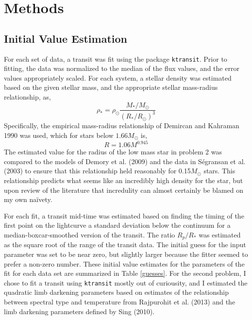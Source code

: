 \documentclass[10pt, preprint]{aastex}
\newcommand{\sol}{\ensuremath{\odot}}
\begin{document}
\section*{Methods}
\subsection{Initial Value Estimation}
For each set of data, a transit was fit using the package \verb|ktransit|. Prior to fitting, the data was normalized to the median of the flux values, and the error values appropriately scaled. For each system, a stellar density was estimated based on the given stellar mass, and the appropriate stellar mass-radius relationship, as, 
\begin{equation}
  \rho_* = \rho_\sol\frac{M_*/M_\sol}{(R_*/R_\sol)^3}
\end{equation}
Specifically, the empirical mass-radius relationship of Demircan and Kahraman 1990 was used, which for stars below $1.66M_\sol$ is,
\begin{equation}
R = 1.06 M^{0.945}
\end{equation}
The estimated value for the radius of the low mass star in problem 2 was compared to the models of Demory et al. (2009) and the data in S\'egransan et al.(2003) to ensure that this relationship held reasonably for 0.15$M_\sol$ stars. This relationship predicts what seems like an incredibly high density for the star, but upon review of the literature that incredulity can almost certainly be blamed on my own na\"ivety. 

For each fit, a transit mid-time was estimated based on finding the timing of the first point on the lightcurve a standard deviation below the continuum for a median-boxcar-smoothed version of the transit. The ratio $R_p/R_*$ was estimated as the square root of the range of the transit data. The initial guess for the input parameter was set to be near zero, but slightly larger because the fitter seemed to prefer a non-zero number. These initial value estimates for the parameters of the fit for each data set are summarized in Table \ref{guesses}. For the second problem, I chose to fit a transit using \verb|ktransit| mostly out of curiousity, and I estimated the quadratic limb darkening parameters based on estimates of the relationship between spectral type and temperature from Rajpurohit et al. (2013) and the limb darkening parameters defined by Sing (2010).
\end{document}
